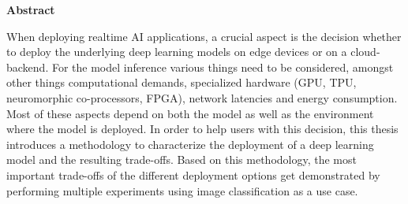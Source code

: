 \vspace*{2cm}

\begin{center}
    \textbf{Abstract}
\end{center}

\vspace*{1cm}


\noindent When deploying realtime AI applications, a crucial aspect is the decision whether to deploy the underlying deep learning models on edge devices or on a cloud-backend.
For the model inference various things need to be considered, amongst other things computational demands,
specialized hardware (GPU, TPU, neuromorphic co-processors, FPGA),
network latencies and energy consumption. Most of these aspects depend on both the model as well as the environment where the model is deployed. 
In order to help users with this decision, this thesis introduces a methodology to characterize the deployment of a deep learning model and the resulting trade-offs.
Based on this methodology, the most important trade-offs of the different deployment options get demonstrated by performing multiple experiments using image classification as a use case.



